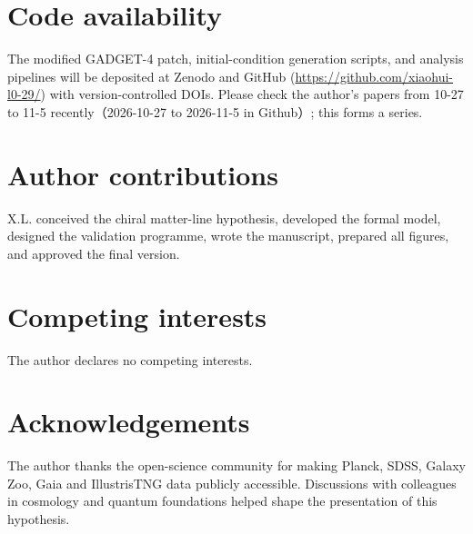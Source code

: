 \documentclass[a4paper,10pt]{article}
\begin{document}
\section{Code availability}

The modified GADGET-4 patch, initial-condition generation scripts, and
analysis pipelines will be deposited at Zenodo and GitHub
(\url{https://github.com/xiaohui-l0-29/}) with version-controlled
DOIs.
Please check the author's papers from 10-27 to 11-5 recently（2026-10-27 to 2026-11-5 in Github）; this forms a series.


\section{Author contributions}

X.L. conceived the chiral matter-line hypothesis, developed the formal model,
designed the validation programme, wrote the manuscript, prepared all figures,
and approved the final version.

\section{Competing interests}

The author declares no competing interests.

\section{Acknowledgements}

The author thanks the open-science community for making Planck, SDSS, Galaxy
Zoo, Gaia and IllustrisTNG data publicly accessible. Discussions with
colleagues in cosmology and quantum foundations helped shape the presentation
of this hypothesis.
\end{document}
